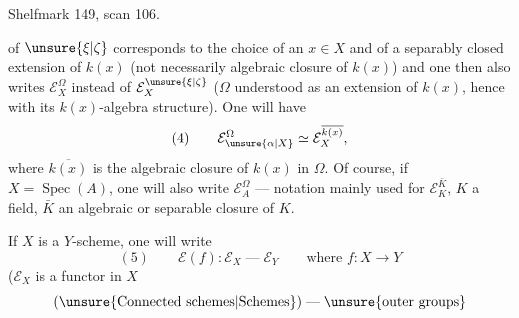 Shelfmark 149, scan 106.

of $\unsure{\xi|\zeta}$ corresponds to the choice of an $x\in X$ and of a separably closed extension  \inserted{$\Omega$} of $k(x)$ (not necessarily  algebraic closure of $k(x)$) and one then also writes $\mathcal E_X^\Omega$ instead of $\mathcal E_X^{\unsure{\xi|\zeta}}$ ($\Omega$ understood as an extension of $k(x)$, hence with its $k(x)$-algebra structure). One will have 
\[
(4)\qquad \mathcal E_{\unsure{\alpha|X}}^\Omega\simeq\mathcal E_X^{\overline{k(x)}},
\]
where $\overline{k(x)}$ is the algebraic closure of $k(x)$ in $\Omega$. Of course, if $X=\operatorname{Spec}(A)$, one will also write $\mathcal E_A^\Omega$ --- notation mainly used for $\mathcal E_K^{\bar K}$, $K$ a field, $\bar K$ an algebraic or separable closure of $K$.

If $X$ is a $Y$-scheme,  one will write
\[
(5)\qquad \mathcal E(f):\mathcal E_X\mathrel{\text{---}}\mathcal E_Y\qquad\text{where }f:X\longrightarrow Y
\]
($\mathcal E_X$ is a functor in $X$
\[
(\unsure{\text{Connected schemes}|\text{Schemes}})\mathrel{\text{---}}\unsure{\text{outer groups}}
\]
